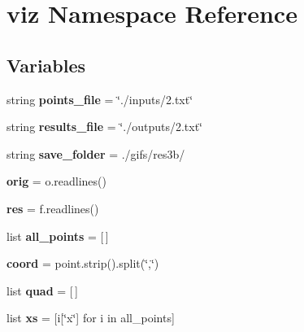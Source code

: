 \hypertarget{namespaceviz}{}\section{viz Namespace Reference}
\label{namespaceviz}
\subsection*{Variables}
\begin{DoxyCompactItemize}
\item 
\mbox{\label{namespaceviz_ad81e048a14308ac78529a2ffab5f840d}} 
string {\bfseries points\+\_\+file} = \char`\"{}./inputs/2.txt\char`\"{}
\item 
\mbox{\label{namespaceviz_a67692ad97c31ca8a38e7782c14c35a8a}} 
string {\bfseries results\+\_\+file} = \char`\"{}./outputs/2.txt\char`\"{}
\item 
\mbox{\label{namespaceviz_ae860dcbc3ac52db67b40fb426d00e796}} 
string {\bfseries save\+\_\+folder} = \textquotesingle{}./gifs/res3b/\textquotesingle{}
\item 
\mbox{\label{namespaceviz_a4d8ae4a594628aab357f474814f27936}} 
{\bfseries orig} = o.\+readlines()
\item 
\mbox{\label{namespaceviz_a6037ad5d1818b795e635575506b7ee25}} 
{\bfseries res} = f.\+readlines()
\item 
\mbox{\label{namespaceviz_ad7494f86d24e37c9e9cbfc22550e0da6}} 
list {\bfseries all\+\_\+points} = \mbox{[}$\,$\mbox{]}
\item 
\mbox{\label{namespaceviz_ac05ef98c53769f73a58977ecd93db4ea}} 
{\bfseries coord} = point.\+strip().split(\char`\"{},\char`\"{})
\item 
\mbox{\label{namespaceviz_a0b7f13b9f924d8f3e1cca1c544722c8a}} 
list {\bfseries quad} = \mbox{[}$\,$\mbox{]}
\item 
\mbox{\label{namespaceviz_a703405b9ba5a09329dc0936c2bc4932c}} 
list {\bfseries xs} = \mbox{[}i\mbox{[}\char`\"{}x\char`\"{}\mbox{]} for i in all\+\_\+points\mbox{]}

\end{DoxyCompactItemize}
